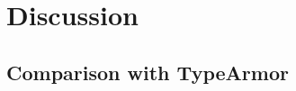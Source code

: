 \section{Discussion}
\label{chapter:Discussion}

\subsection{Comparison with TypeArmor}
\label{section:comptype}


